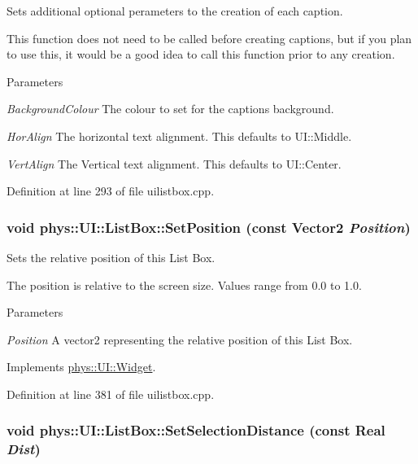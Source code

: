 Sets additional optional perameters to the creation of each caption. 

This function does not need to be called before creating captions, but if you plan to use this, it would be a good idea to call this function prior to any creation. 
\begin{DoxyParams}{Parameters}
\item[{\em BackgroundColour}]The colour to set for the captions background. \item[{\em HorAlign}]The horizontal text alignment. This defaults to UI::Middle. \item[{\em VertAlign}]The Vertical text alignment. This defaults to UI::Center. \end{DoxyParams}


Definition at line 293 of file uilistbox.cpp.

\hypertarget{classphys_1_1UI_1_1ListBox_ac7e4d02b6be093bd31f9904d6c0ef88f}{
\subsubsection[{SetPosition}]{\setlength{\rightskip}{0pt plus 5cm}void phys::UI::ListBox::SetPosition (const {\bf Vector2} {\em Position})}}
\label{d0/d28/classphys_1_1UI_1_1ListBox_ac7e4d02b6be093bd31f9904d6c0ef88f}


Sets the relative position of this List Box. 

The position is relative to the screen size. Values range from 0.0 to 1.0. 
\begin{DoxyParams}{Parameters}
\item[{\em Position}]A vector2 representing the relative position of this List Box. \end{DoxyParams}


Implements \hyperlink{classphys_1_1UI_1_1Widget_a3f1cd1ce55660c7de4859983bac1ab7c}{phys::UI::Widget}.



Definition at line 381 of file uilistbox.cpp.

\hypertarget{classphys_1_1UI_1_1ListBox_a436882336e5630d97f569b10273e7f0d}{
\subsubsection[{SetSelectionDistance}]{\setlength{\rightskip}{0pt plus 5cm}void phys::UI::ListBox::SetSelectionDistance (const {\bf Real} {\em Dist})}}
\label{d0/d28/classphys_1_1UI_1_1ListBox_a436882336e5630d97f569b10273e7f0d}



